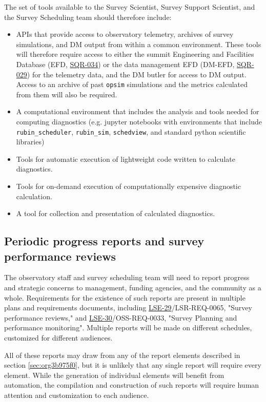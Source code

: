 The set of tools available to the Survey Scientist, Survey Support Scientist, and the Survey Scheduling team should therefore include:
\begin{itemize}
\item APIs that provide access to observatory telemetry, archives of survey simulations, and DM output from within a common environment. These tools will therefore require access to either the summit Engineering and Facilities Database (EFD, \href{https://ls.st/sql-034}{SQR-034}) or the data management EFD (DM-EFD, \href{https://ls.st/sqr-029}{SQR-029}) for the telemetry data, and the DM butler for access to DM output. Access to an archive of past \texttt{opsim} simulations and the metrics calculated from them will also be required.
\item A computational environment that includes the analysis and tools needed for computing diagnostics (e.g. jupyter notebooks with environments that include \texttt{rubin\_scheduler}, \texttt{rubin\_sim}, \texttt{schedview}, and standard python scientific libraries)
\item Tools for automatic execution of lightweight code written to calculate diagnostics.
\item Tools for on-demand execution of computationally expensive diagnostic calculation.
\item A tool for collection and presentation of calculated diagnostics.
\end{itemize}

\subsection{Periodic progress reports and survey performance reviews}
\label{sec:orgc147ca5}
The observatory staff and survey scheduling team will need to report progress and strategic concerns to management, funding agencies, and the community as a whole. Requirements for the existence of such reports are present in multiple plans and requirements documents, including  \href{https://ls.st/lse-29}{LSE-29}/LSR-REQ-0065, "Survey performance reviews," 
and \href{https://ls.st/lse-30}{LSE-30}/OSS-REQ-0033, "Survey Planning and performance monitoring".  Multiple reports will be made on different schedules, customized for different audiences.

All of these reports may draw from any of the report elements described in section \ref{sec:org3b975f0}, but it is unlikely that any single report will require every element.
While the generation of individual elements will benefit from automation, the compilation and construction of such reports will require human attention and customization to each audience. 


